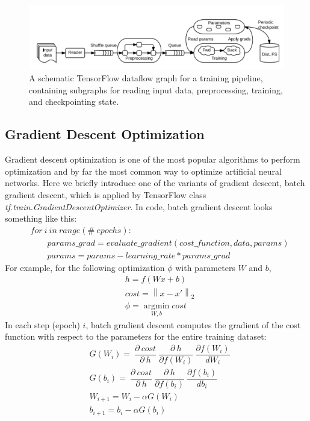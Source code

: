 \documentclass[12pt]{report} %
\newcommand{\norm}[1]{\left\lVert #1 \right\rVert}
\begin{document}
\begin{figure}[H]
	\centering
	\includegraphics[scale=1.0]{pictures/tensorflow.png}
	\caption{A schematic TensorFlow dataflow graph for a training pipeline, containing subgraphs for reading input data, preprocessing, training, and checkpointing state\cite{TFPIC}.}
	\label{fig:3}
\end{figure}

\subsection{Gradient Descent Optimization}
Gradient descent optimization\cite{GDO} is one of the most popular algorithms to perform optimization and by far the most common way to optimize artificial neural networks. Here we briefly introduce one of the variants of gradient descent, batch gradient descent, which is applied by TensorFlow class \textit{tf.train.GradientDescentOptimizer}\cite{TFGDO}. In code, batch gradient descent looks something like this:
\begin{equation}
\begin{split}
&for\ i\ in\ range ( \#\ epochs ): \\
&\qquad params\_grad = evaluate\_gradient ( cost\_function , data , params ) \\
&\qquad params = params - learning\_rate * params\_grad
\end{split}
\end{equation}
For example, for the following optimization $\phi$ with parameters $W$ and $b$,
\begin{equation}
\begin{split}
&h=f(Wx +b)\\
&cost=\norm{x-x'}_2\\
&\phi=\operatorname*{argmin}_{W,b}cost
\end{split}
\end{equation}
In each step (epoch) $i$, batch gradient descent computes the gradient of the cost function with respect to the parameters for the entire training dataset:
\begin{equation}
\begin{split}
&G({W_i})=\ \dfrac{\partial\ cost}{\partial\ h}\ \dfrac{\partial\ h}{\partial f(W_i)}\ \dfrac{\partial f(W_i)}{dW_i} \\
&G({b_i}) =\ \dfrac{\partial\ cost}{\partial\ h}\ \dfrac{\partial\ h}{\partial f(b_i)}\ \dfrac{\partial f(b_i)}{db_i} \\
&W_{i+1}=W_i - \alpha G(W_i) \\
&b_{i+1}=b_i - \alpha G(b_i)
\end{split}
\end{equation}
\end{document}
